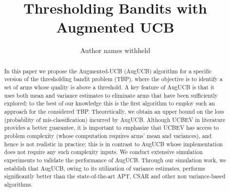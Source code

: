 \documentclass{article}
\title{Thresholding Bandits with Augmented UCB}
\author{Author names withheld}
\begin{document}
\maketitle

\begin{abstract}
In this paper we propose the Augmented-UCB (AugUCB) algorithm for a specific version of the thresholding bandit problem (TBP), where the objective is to identify a set of arms whose quality is above a threshold. A key feature of AugUCB is that it uses both mean and variance estimates to eliminate arms that have been sufficiently explored; to the best of our knowledge this is the first algorithm to employ such an approach for the considered TBP.  Theoretically, we obtain an upper bound on the loss (probability of mis-classification) incurred by AugUCB. Although UCBEV in literature provides a better guarantee, it is important to emphasize that UCBEV has access to problem complexity (whose computation requires arms' mean and variances), and hence is not realistic in practice; this is in contrast to AugUCB whose implementation does not require any such complexity inputs. We conduct extensive simulation experiments to validate the performance of AugUCB. Through our simulation work, we establish that AugUCB, owing to its utilization of variance estimates, performs significantly better than the state-of-the-art APT, CSAR and other non variance-based algorithms.






\end{abstract}
\end{document}
